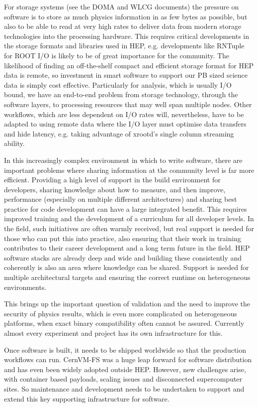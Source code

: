 \documentclass[11pt,a4paper]{article}
\begin{document}
For storage systems (see the DOMA and WLCG documents) the pressure on
software is to store as much physics information in as few bytes as
possible, but also to be able to read at very high rates to deliver data
from modern storage technologies into the processing hardware. This
requires critical developments in the storage formats and libraries used
in HEP, e.g. developments like RNTuple for ROOT I/O is likely to be of
great importance for the community. The likelihood of finding an
off-the-shelf compact and efficient storage format for HEP data is
remote, so investment in smart software to support our PB sized science
data is simply cost effective. Particularly for analysis, which is
usually I/O bound, we have an end-to-end problem from storage
technology, through the software layers, to processing resources that
may well span multiple nodes. Other workflows, which are less dependent
on I/O rates will, nevertheless, have to be adapted to using remote data
where the I/O layer must optimise data transfers and hide latency, e.g.
taking advantage of xrootd's single column streaming ability.

In this increasingly complex environment in which to write software,
there are important problems where sharing information at the community
level is far more efficient. Providing a high level of support in the
build environment for developers, sharing knowledge about how to
measure, and then improve, performance (especially on multiple different
architectures) and sharing best practice for code development can have a
large integrated benefit. This requires improved training and the
development of a curriculum for all developer levels. In the field, such
initiatives are often warmly received, but real support is needed for
those who can put this into practice, also ensuring that their work in
training contributes to their career development and a long term future
in the field. HEP software stacks are already deep and wide and building
these consistently and coherently is also an area where knowledge can be
shared. Support is needed for multiple architectural targets and
ensuring the correct runtime on heterogeneous environments.

This brings up the important question of validation and the need to
improve the security of physics results, which is even more complicated
on heterogeneous platforms, when exact binary compatibility often cannot
be assured. Currently almost every experiment and project has its own
infrastructure for this.

Once software is built, it needs to be shipped worldwide so that the
production workflows can run. CernVM-FS was a huge leap forward for
software distribution and has even been widely adopted outside HEP.
However, new challenges arise, with container based payloads, scaling
issues and disconnected supercomputer sites. So maintenance and
development needs to be undertaken to support and extend this key
supporting infrastructure for software.
\end{document}

